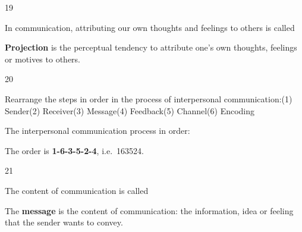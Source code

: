 \begin{question}{19}
{In communication, attributing our own thoughts and feelings to others is called \blank{}\par}
\begin{explain}
\textbf{Projection} is the perceptual tendency to attribute one's own thoughts, feelings or motives to others.
\end{explain}
\end{question}

\begin{question}{20}
{Rearrange the steps in order in the process of interpersonal communication:\newline (1) Sender\newline (2) Receiver\newline (3) Message\newline (4) Feedback\newline (5) Channel\newline (6) Encoding\par}
\begin{explain}
The interpersonal communication process in order:
\begin{center}
\end{center}
The order is \textbf{1-6-3-5-2-4}, i.e.\ 163524.
\end{explain}
\end{question}

\begin{question}{21}
{The content of communication is called \blank{}\par}
\begin{explain}
The \textbf{message} is the content of communication: the information, idea or feeling that the sender wants to convey.
\end{explain}
\end{question}

